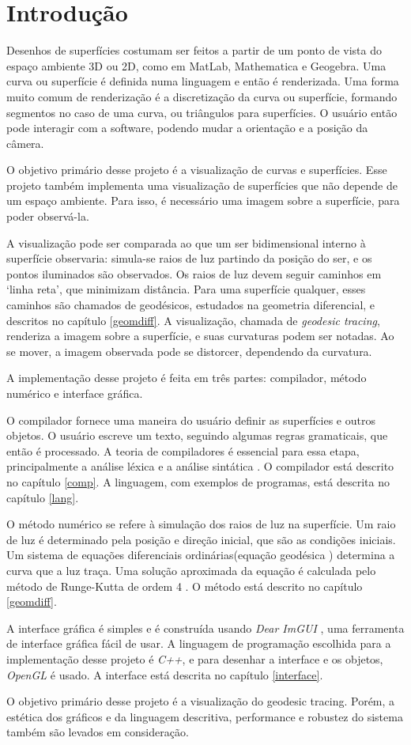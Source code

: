 \chapter{Introdução}
Desenhos de superfícies costumam ser feitos a partir de um ponto de vista do
espaço ambiente 3D ou 2D, como em MatLab, Mathematica e Geogebra.
Uma curva ou superfície é definida numa linguagem e então é renderizada.
Uma forma muito comum de renderização é a discretização da curva ou superfície,
formando segmentos no caso de uma curva, ou triângulos para superfícies.
O usuário então pode interagir com a software, podendo mudar a orientação e a posição
da câmera.

O objetivo primário desse projeto é a visualização de curvas e superfícies.
Esse projeto também implementa uma visualização de superfícies que não depende de um espaço ambiente.
Para isso, é necessário uma imagem sobre a superfície, para poder observá-la.

A visualização pode ser comparada ao que um ser bidimensional interno à superfície observaria:
simula-se raios de luz partindo da posição do ser, e os pontos iluminados são observados.
Os raios de luz devem seguir caminhos em `linha reta', que minimizam distância.
Para uma superfície qualquer, esses caminhos são chamados de geodésicos,
estudados na geometria diferencial, e descritos no capítulo \ref{geomdiff}.
A visualização, chamada de \textit{geodesic tracing}, renderiza a imagem sobre a superfície,
e suas curvaturas podem ser notadas. Ao se mover, a imagem observada pode se distorcer,
dependendo da curvatura.

A implementação desse projeto é feita em três partes:
compilador, método numérico e interface gráfica.

O compilador fornece uma maneira do usuário definir as superfícies e outros objetos.
O usuário escreve um texto, seguindo algumas regras gramaticais, que então é processado.
A teoria de compiladores é essencial para essa etapa,
principalmente a análise léxica e a análise sintática \cite{Dragon:1}.
O compilador está descrito no capítulo \ref{comp}.
A linguagem, com exemplos de programas, está descrita no capítulo \ref{lang}.

O método numérico se refere à simulação dos raios de luz na superfície.
Um raio de luz é determinado pela posição e direção inicial, que são as condições iniciais.
Um sistema de equações diferenciais ordinárias(equação geodésica \cite{GeomDiff:1})
determina a curva que a luz traça.
Uma solução aproximada da equação é calculada pelo método de Runge-Kutta de ordem 4 \cite{Anal:1}.
O método está descrito no capítulo \ref{geomdiff}.

A interface gráfica é simples e é construída usando \textit{Dear ImGUI} \cite{ImGui},
uma ferramenta de interface gráfica fácil de usar.
A linguagem de programação escolhida para a implementação desse projeto é \textit{C++},
e para desenhar a interface e os objetos, \textit{OpenGL} é usado.
A interface está descrita no capítulo \ref{interface}.

O objetivo primário desse projeto é a visualização do geodesic tracing.
Porém, a estética dos gráficos e da linguagem descritiva, performance 
e robustez do sistema também são levados em consideração.
